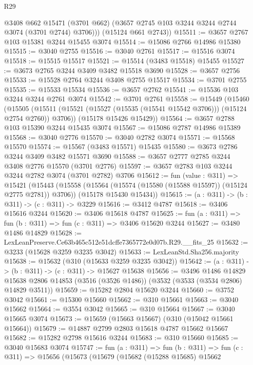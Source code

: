 \begin{lexlean}{R29}
\begin{coremodule}
          @3408
          @662
          @15471
          (@3701 @662)
          (@3657 @2745 @103 @3244 @3244 @2744 @3074 (@3701 @2744) @3706)))
      (@15124 @661 @2743))
@15511 := @3657 @2767 @103 @15381 @3244 @15455 @3074
@15514 := @15086 @2766 @14986 @15380
@15515 := @3040 @2755
@15516 := @3040 @2761
@15517 := @15516 @3074
@15518 := @15515 @15517
@15521 := @15514 (@3483 @15518) @15455
@15527 := @3673 @2765 @3244 @3409 @3482 @15518 @3690
@15528 := @3657 @2756
@15533 := @15528 @2764 @3244 @3408 @2755 @15517
@15534 := @3701 @2755
@15535 := @15533 @15534
@15536 := @3657 @2762
@15541 := @15536 @103 @3244 @3244 @2761 @3074
@15542 := @3701 @2761
@15558 := @15449
    (@15460
      (@15505 (@15511 (@15521 (@15527 (@15535 (@15541 @15542 @3706))) (@15124 @2754 @2760)) @3706))
      (@15178 @15426 @15429))
@15564 := @3657 @2788 @103 @15390 @3244 @15435 @3074
@15567 := @15086 @2787 @14986 @15389
@15568 := @3040 @2776
@15570 := @3040 @2782 @3074
@15571 := @15568 @15570
@15574 := @15567 (@3483 @15571) @15435
@15580 := @3673 @2786 @3244 @3409 @3482 @15571 @3690
@15588 := @3657 @2777 @2785 @3244 @3408 @2776 @15570 (@3701 @2776)
@15597 := @3657 @2783 @103 @3244 @3244 @2782 @3074 (@3701 @2782) @3706
@15612 := fun (value : @311) =>
  @15421
    (@15443
      (@15558 (@15564 (@15574 (@15580 (@15588 @15597)) (@15124 @2775 @2781)) @3706))
      (@15178 @15430 @15434))
@15615 := (a : @311) -> (b : @311) -> (c : @311) -> @3229
@15616 := @3412 @4787
@15618 := @3406 @15616 @3244
@15620 := @3406 @15618 @4787
@15625 := fun (a : @311) => fun (b : @311) => fun (c : @311) => @3406 @15620 @3244
@15627 := @3480 @1486 @14829
@15628 := LexLeanPreserve.Ce63b465c512e51dcffe7365772e0d07b.R29.__fits_25
@15632 := @3233 (@15628 @3259 @3235 @3042)
@15633 := LexLeanStd.Sha256.majority
@15638 := @15632 (@310 (@15633 @3259 @3235 @3042))
@15642 := (a : @311) -> (b : @311) -> (c : @311) -> @15627 @15638
@15656 := @3496
    @1486
    @14829
    @15638
    @2806
    @14853
    (@3516 (@3526 @1486))
    (@3532 (@3533 (@3534 @2806) @14829 @3511))
@15659 := @15282 @2804 @15620 @3244
@15660 := @3752 @3042
@15661 := @15300 @15660
@15662 := @310 @15661
@15663 := @3040 @15662
@15664 := @3554 @3042
@15665 := @310 @15664
@15667 := @3040 @15665 @3074
@15673 := @15659 (@15663 @15667) (@310 (@15042 @15661 @15664))
@15679 := @14887 @2799 @2803 @15618 @4787 @15662 @15667
@15682 := @15282 @2798 @15616 @3244
@15683 := @310 @15660
@15685 := @3040 @15683 @3074
@15747 := fun (a : @311) =>
  fun (b : @311) =>
  fun (c : @311) =>
  @15656
    (@15673
      (@15679
        (@15682
          (@15288 @15685)
          @15662

\end{coremodule}
\end{lexlean}

